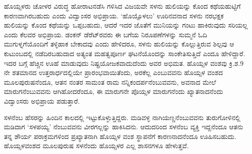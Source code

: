 ಹೊಯ್ಸಳರು ಚೋಳರ ವಿರುದ್ಧ ಹೋರಾಟನಡೆಸಿ ಗಳಿಸಿದ ವಿಜಯವೇ ಸಳನು ಹುಲಿಯನ್ನು ಕೊಂದ ಕಥೆಯ\break ಹುಟ್ಟಿಗೆ ಕಾರಣವಾಗಿರಬಹುದು ಎಂದು ವಿದ್ವಾಂಸರ ಅಭಿಪ್ರಾಯ. ‘ಹೊಯ್ಸೊಳಲು’ ಊರಿನವನಾದ ಸಳನು ನರಭಕ್ಷಕ ಹುಲಿಯನ್ನು ಕೊಂದ ಕಥೆಯನ್ನು ಒಪ್ಪಬಹುದು, ಆದರೆ ಇದರ ಜೊತೆಗೆ ಮುನಿಯನ್ನು ಗಂಟು ಹಾಕಿರುವುದು ಸರಿಯಲ್ಲ ಎಂದು ಕೆಲವರ ಅಭಿಪ್ರಾಯ. ಡಂಕನ್​ ಡೆರೆಟ್​ರವರು ಈ ಬಗೆಯ ನಿರೂಪಣೆಗಳನ್ನು ಸುಮ್ಮನೆ ಓದಿ ಮುಗುಳ್ನಗೆಯೊಂದಿಗೆ ತಳ್ಳಿಹಾಕ ಬೇಕಾದವು ಎಂದು ಹೇಳಿದರೂ, ಸಳನು ಹುಲಿಯನ್ನು ಕೊಲ್ಲುತ್ತಿರುವ ಶಿಲ್ಪವು ಆ ಕುಟುಂಬದಲ್ಲಿ ನಡೆದಿರಬಹುದಾದ ಅತ್ಯಂತ ಮಹತ್ವಪೂರ್ಣ ಘಟನೆಯೊಂದನ್ನು ಸಾಂಕೇತಿಸುತ್ತಿದೆ ಎಂದೂ ಹೇಳಿದ್ದಾರೆ. ಇದರ ಬಗ್ಗೆ ಹೆಚ್ಚಿನ ಊಹೆ ಮಾಡುವುದು ನಿಷ್ಪ್ರಯೋಜಕವಾದುದೆಂದು ಅವರ ಅಭಿಮತ. ಹೊಯ್ಸಳ ವಂಶವು ಕ್ರಿ.ಶ.9 ನೇ ಶತಮಾನದ ಉತ್ತರಾರ್ಧದಲ್ಲಿಯೇ ಪ್ರಾರಂಭವಾಯಿತೆಂದು, ಅರಕೆಲ್ಲ ಎಂಬುವವನು ಹೊಯ್ಸಳ ವಂಶದ ಮೂಲಪುರುಷನೆಂದೂ, ಆತನ ನಂತರ ಸಾಮಂತ ರಾಮ ನನ್ನಿಕಂದರ್ಪನೆಂಬುವವನು, ಅವನಾದ ಮೇಲೆ ಮಾರುಗನೆಂಬುವವನು ಆಗಿಹೋದರೆಂದೂ, ಈ ಮಾರುಗನೇ ಪೊಯ್ಸಳ ಮಾರುಗನೆಂದು ಖ್ಯಾತನಾದನೆಂದು ವಿದ್ವಾಂಸರು ಅಭಿಪ್ರಾಯ ಪಡುತ್ತಾರೆ.

ಸಳನೆಂಬ ಹೆಸರನ್ನು ಹಿಂದಿನ ಕಾಲದಲ್ಲಿ ಇಟ್ಟುಕೊಳ್ಳುತ್ತಿದ್ದರು. ಮಡಿವಳ್ಳ ನಾಗಿಯಣ್ಣನೆಂಬುವವನು ತುರುಗೋಳಿನಲ್ಲಿ ಮಡಿದಾಗ ‘ಸಳಪಯ್ಯ’ ನೆಂಬುವವನು ವೀರಗಲ್ಲನ್ನು ಹಾಕಿಸಿದನು. ಆದುದರಿಂದ ಸಳನೆಂಬ ವ್ಯಕ್ತಿ ಇದ್ದನೆಂದೂ ಆತನು ತನ್ನ ಶೌರ್ಯ ಪರಾಕ್ರಮಗಳಿಂದ ಪ್ರಖ್ಯಾತನಾಗಿ ಹೊಯ್ಸಳ ವಂಶ ಸ್ಥಾಪನೆಗೆ ಕಾರಣನಾದನೆಂದೂ ಊಹಿಸಬಹುದು. ಹೊಯ್ಸಳವಂಶದ ಮೂಲಪುರುಷ ಸಳನೆಂದು ಹೊಯ್ಸಳರ ಎಲ್ಲ ಶಾಸನಗಳೂ ಹೇಳುತ್ತವೆ.

